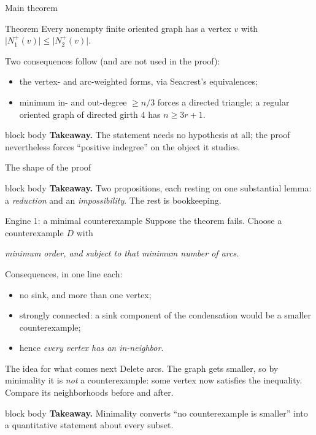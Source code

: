 \documentclass[aspectratio=169,11pt]{beamer}
\newcommand{\abs}[1]{\lvert #1\rvert}
\newcommand{\takeaway}[1]{%
  \vfill
  \begin{beamercolorbox}[wd=\dimexpr\textwidth-9pt\relax,sep=4pt,rounded=true]{block body}
    \footnotesize\color{mainblue}\textbf{Takeaway.} \color{black}#1
  \end{beamercolorbox}}
\begin{document}
\begin{frame}{Main theorem}
  \begin{block}{Theorem}
    Every nonempty finite oriented graph has a vertex $v$ with
    $\abs{N_1^+(v)}\le\abs{N_2^+(v)}$.
  \end{block}
  \medskip
  \small
  Two consequences follow (and are not used in the proof):
  \begin{itemize}
    \item the vertex- and arc-weighted forms, via Seacrest's equivalences;
    \item minimum in- and out-degree $\ge n/3$ forces a directed triangle; a regular oriented
      graph of directed girth $4$ has $n\ge 3r+1$.
  \end{itemize}
  \takeaway{The statement needs no hypothesis at all; the proof nevertheless forces
  ``positive indegree'' on the object it studies.}
\end{frame}

\begin{frame}{The shape of the proof}
  \centering
  \scalebox{0.76}{}
  \takeaway{Two propositions, each resting on one substantial lemma: a \emph{reduction} and an
  \emph{impossibility}. The rest is bookkeeping.}
\end{frame}

\begin{frame}{Engine 1: a minimal counterexample}
  \small
  Suppose the theorem fails. Choose a counterexample $D$ with
  \begin{center}
    \emph{minimum order, and subject to that minimum number of arcs.}
  \end{center}
  \medskip
  Consequences, in one line each:
  \begin{itemize}
    \item no sink, and more than one vertex;
    \item strongly connected: a sink component of the condensation would be a smaller
      counterexample;
    \item hence \emph{every vertex has an in-neighbor}.
  \end{itemize}
  \medskip
  \begin{block}{The idea for what comes next}
    Delete arcs. The graph gets smaller, so by minimality it is \emph{not} a counterexample: some
    vertex now satisfies the inequality. Compare its neighborhoods before and after.
  \end{block}
  \takeaway{Minimality converts ``no counterexample is smaller'' into a quantitative statement
  about every subset.}
\end{frame}
\end{document}
